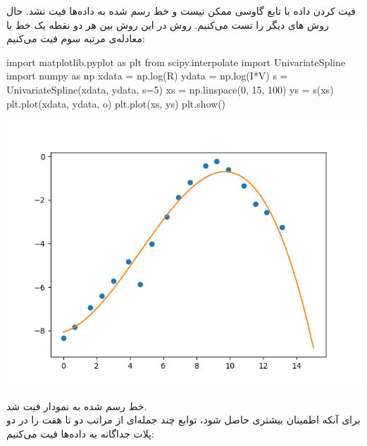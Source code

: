 \documentclass{article}
\newenvironment{Shaded}{}{}
\newcommand{\DecValTok}[1]{\textcolor[rgb]{0.25,0.63,0.44}{#1}}
\newcommand{\ImportTok}[1]{#1}
\newcommand{\NormalTok}[1]{#1}
\newcommand{\OperatorTok}[1]{\textcolor[rgb]{0.40,0.40,0.40}{#1}}
\newcommand{\StringTok}[1]{\textcolor[rgb]{0.25,0.44,0.63}{#1}}
\begin{document}
فیت کردن  داده با تابع گاوسی ممکن نیست و خط رسم شده به داده‌ها فیت نشد. حال روش های دیگر را تست می‌کنیم. روش  در این روش بین هر دو نقطه یک خط با معادله‌ی مرتبه سوم فیت می‌کنیم:
\begin{latin}
\begin{Shaded}
\begin{Highlighting}[]
\ImportTok{import}\NormalTok{ matplotlib.pyplot }\ImportTok{as}\NormalTok{ plt}
\ImportTok{from}\NormalTok{ scipy.interpolate }\ImportTok{import}\NormalTok{ UnivariateSpline}
\ImportTok{import}\NormalTok{ numpy }\ImportTok{as}\NormalTok{ np}
\NormalTok{xdata }\OperatorTok{=}\NormalTok{ np.log(R)}
\NormalTok{ydata }\OperatorTok{=}\NormalTok{ np.log(I}\OperatorTok{*}\NormalTok{V)}
\NormalTok{s }\OperatorTok{=}\NormalTok{ UnivariateSpline(xdata, ydata, s}\OperatorTok{=}\DecValTok{5}\NormalTok{)}
\NormalTok{xs }\OperatorTok{=}\NormalTok{ np.linspace(}\DecValTok{0}\NormalTok{, }\DecValTok{15}\NormalTok{, }\DecValTok{100}\NormalTok{)}
\NormalTok{ys }\OperatorTok{=}\NormalTok{ s(xs)}
\NormalTok{plt.plot(xdata, ydata, }\StringTok{\textquotesingle{}o\textquotesingle{}}\NormalTok{)}
\NormalTok{plt.plot(xs, ys)}
\NormalTok{plt.show()}
\end{Highlighting}
\end{Shaded}
\begin{center}
\includegraphics[scale=0.75]{Spline fit.png}
\end{center}
\end{latin}
خط رسم شده به نمودار فیت شد. \\
برای آنکه اطمینان بیشتری حاصل شود، توابع چند جمله‌ای از مراتب دو تا هفت را در دو پلات جداگانه به داده‌ها فیت می‌کنیم:
\end{document}
